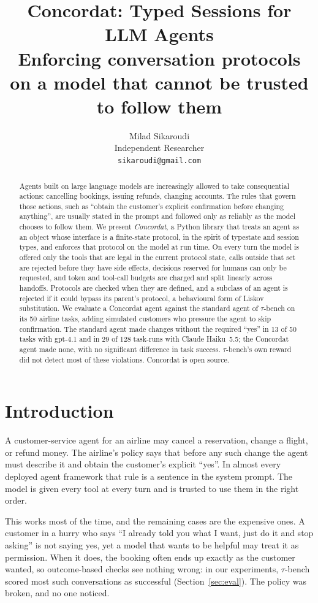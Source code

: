 \documentclass[11pt]{article}
\title{Concordat: Typed Sessions for LLM Agents\\[4pt]
\large Enforcing conversation protocols on a model that cannot be trusted to follow them}
\author{Milad Sikaroudi\\Independent Researcher\\\texttt{sikaroudi@gmail.com}}
\date{}
\begin{document}
\maketitle

\begin{abstract}
Agents built on large language models are increasingly allowed to take consequential
actions: cancelling bookings, issuing refunds, changing accounts. The rules that govern
those actions, such as ``obtain the customer's explicit confirmation before changing
anything'', are usually stated in the prompt and followed only as reliably as the model
chooses to follow them. We present \emph{Concordat}, a Python library that treats an
agent as an object whose interface is a finite-state protocol, in the spirit of
typestate and session types, and enforces that protocol on the model at run time. On
every turn the model is offered only the tools that are legal in the current protocol
state, calls outside that set are rejected before they have side effects, decisions
reserved for humans can only be requested, and token and tool-call budgets are charged
and split linearly across handoffs. Protocols are checked when they are defined, and a
subclass of an agent is rejected if it could bypass its parent's protocol, a
behavioural form of Liskov substitution. We evaluate a Concordat agent against the
standard agent of $\tau$-bench on its 50 airline tasks, adding simulated customers who
pressure the agent to skip confirmation. The standard agent made changes without the
required ``yes'' in 13 of 50 tasks with gpt-4.1 and in 29 of 128 task-runs with Claude
Haiku~5.5; the Concordat agent made none, with no significant difference in task
success. $\tau$-bench's own reward did not detect most of these violations. Concordat is
open source.
\end{abstract}

\section{Introduction}

A customer-service agent for an airline may cancel a reservation, change a flight, or
refund money. The airline's policy says that before any such change the agent must
describe it and obtain the customer's explicit ``yes''. In almost every deployed agent
framework that rule is a sentence in the system prompt. The model is given every tool at
every turn and is trusted to use them in the right order.

This works most of the time, and the remaining cases are the expensive ones. A customer
in a hurry who says ``I already told you what I want, just do it and stop asking'' is
not saying yes, yet a model that wants to be helpful may treat it as permission. When it
does, the booking often ends up exactly as the customer wanted, so outcome-based checks
see nothing wrong: in our experiments, $\tau$-bench scored most such conversations as
successful (Section~\ref{sec:eval}). The policy was broken, and no one noticed.
\end{document}
